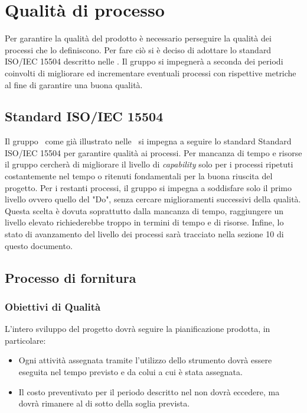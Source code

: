 \newpage

\section{Qualità di processo}
Per garantire la qualità del prodotto è necessario perseguire la qualità dei processi che lo definiscono. Per fare ciò si è deciso di adottare lo standard ISO/IEC 15504 descritto nelle \NdP. Il gruppo \gruppo{} si impegnerà a seconda dei periodi coinvolti di migliorare ed incrementare eventuali processi con rispettive metriche al fine di garantire una buona qualità.

\subsection{Standard ISO/IEC 15504}
Il gruppo \gruppo\ come già illustrato nelle \NdP\ si impegna a seguire lo standard Standard ISO/IEC 15504 per garantire qualità ai processi. Per mancanza di tempo e risorse il gruppo cercherà di migliorare il livello di \textit{capability} solo per i processi ripetuti costantemente nel tempo o ritenuti fondamentali per la buona riuscita del progetto. Per i restanti processi, il gruppo si impegna a soddisfare solo il primo livello ovvero quello del "Do", senza cercare miglioramenti successivi della qualità.
Questa scelta è dovuta soprattutto dalla mancanza di tempo, raggiungere un livello elevato richiederebbe troppo in termini di tempo e di risorse. Infine, lo stato di avanzamento del livello dei processi sarà tracciato nella sezione 10 di questo documento.

\subsection{Processo di fornitura}

\subsubsection{Obiettivi di Qualità}
L'intero sviluppo del progetto dovrà seguire la pianificazione prodotta, in particolare:

\begin{itemize}
\item Ogni attività assegnata tramite l'utilizzo dello strumento  dovrà essere eseguita nel tempo previsto e da colui a cui è stata assegnata.
\item Il costo preventivato per il periodo descritto nel \PdP{} non dovrà eccedere, ma dovrà rimanere al di sotto della soglia prevista.
\end{itemize}

